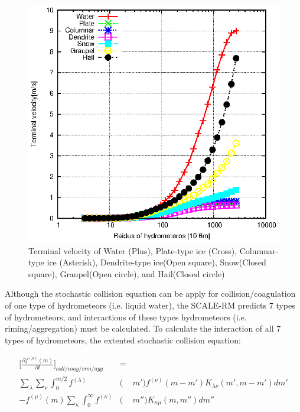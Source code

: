 \begin{figure}[ht]
\begin{center}
\includegraphics[scale=0.9]{./figure/terminal-velocity.eps}
\end{center}
\caption{Terminal velocity of Water (Plus), Plate-type ice (Cross), Columnar-type ice (Asterisk), Dendrite-type ice(Open square), Snow(Closed square), Graupel(Open circle), and Hail(Closed circle)}
\label{figs10-term}
\end{figure}


Although the stochastic collision equation can be apply for collision/coagulation of one type of hydrometeors (i.e. liquid water), the SCALE-RM predicts 7 types of hydrometeors, and interactions of these types hydrometeors (i.e. riming/aggregation) must be calculated. To calculate the interaction of all 7 types of hydrometeors, the extented stochastic collision equation:

\begin{eqnarray}
\Bigr[\frac{\partial f^{(\mu)}(m)}{\partial t}\Bigr]_{coll/coag/rim/agg}&=&\nonumber\\
\sum_{\lambda}\sum_{\nu}\int_{0}^{m/2}f^{(\lambda)}&(&m')f^{(\nu)}(m-m')K_{\lambda\nu}(m',m-m')dm' \nonumber\\
-f^{(\mu)}(m)\sum_{\kappa}\int_0^{\infty}f^{(\kappa)}&(&m'')K_{\kappa\mu}(m,m'')dm''\label{s10-16}
\end{eqnarray}

